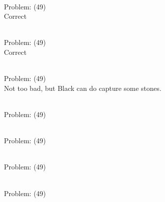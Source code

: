 \documentclass[11pt]{article}
\begin{document}
\begin{minipage}[t]{0.5\textwidth}
  {\centering
  
\\
Problem: (49)\\
Correct\\
  }
\end{minipage}
\begin{minipage}[t]{0.5\textwidth}
  {\centering
  
\\
Problem: (49)\\
Correct\\
  }
\end{minipage}
\begin{minipage}[t]{0.5\textwidth}
  {\centering
  
\\
Problem: (49)\\
Not too bad, but Black can do capture some stones.\\
  }
\end{minipage}
\begin{minipage}[t]{0.5\textwidth}
  {\centering
  
\\
Problem: (49)\\
  }
\end{minipage}
\begin{minipage}[t]{0.5\textwidth}
  {\centering
  
\\
Problem: (49)\\
  }
\end{minipage}
\begin{minipage}[t]{0.5\textwidth}
  {\centering
  
\\
Problem: (49)\\
  }
\end{minipage}
\begin{minipage}[t]{0.5\textwidth}
  {\centering
  
\\
Problem: (49)\\
  }
\end{minipage}
\end{document}
